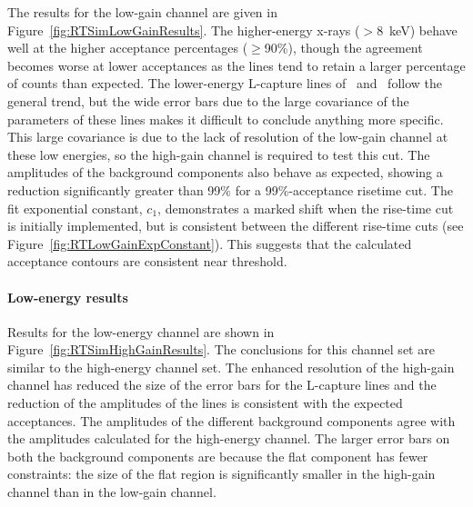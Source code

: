 The results for the low-gain channel are given in Figure~\ref{fig:RTSimLowGainResults}.  The higher-energy x-rays ($>8$~keV) behave well at the higher acceptance percentages ($\ge$90\%), though the agreement becomes worse at lower acceptances as the lines tend to retain a larger percentage of counts than expected.  The lower-energy L-capture lines of \gersixeight~and \znsixfive~follow the general trend, but the wide error bars due to the large covariance of the parameters of these lines makes it difficult to conclude anything more specific.  This large covariance is due to the lack of resolution of the low-gain channel at these low energies, so the high-gain channel is required to test this cut.  The amplitudes of the background components also behave as expected, showing a reduction significantly greater than 99\% for a 99\%-acceptance risetime cut.  The fit exponential constant, $c_{1}$, demonstrates a marked shift when the rise-time cut is initially implemented, but is consistent between the different rise-time cuts (see Figure~\ref{fig:RTLowGainExpConstant}).  This suggests that the calculated acceptance contours are consistent near threshold.  


						\begin{sidewaysfigure}
							\centering
							\caption{Simulation results for low-gain channel.}
							\label{fig:RTSimLowGainResults}
						\end{sidewaysfigure}

					\paragraph{Low-energy results}

Results for the low-energy channel are shown in Figure~\ref{fig:RTSimHighGainResults}. The conclusions for this channel set are similar to the high-energy channel set.  The enhanced resolution of the high-gain channel has reduced the size of the error bars for the L-capture lines and the reduction of the amplitudes of the lines is consistent with the expected acceptances.  The amplitudes of the different background components agree with the amplitudes calculated for the high-energy channel.  The larger error bars on both the background components are because the flat component has fewer constraints: the size of the flat region is significantly smaller in the high-gain channel than in the low-gain channel.  


